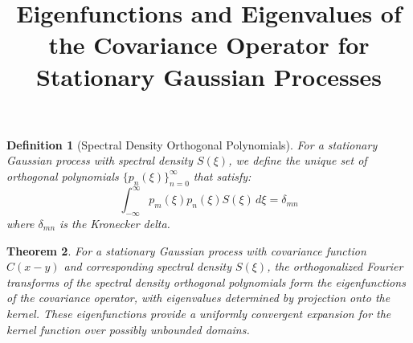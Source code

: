 \documentclass{article}
\title{Eigenfunctions and Eigenvalues of the Covariance Operator for Stationary Gaussian Processes}
\author{}
\date{}
\newtheorem{theorem}{Theorem}
\newtheorem{definition}[theorem]{Definition}
\begin{document}
\maketitle

\begin{definition}[Spectral Density Orthogonal Polynomials]
For a stationary Gaussian process with spectral density $S(\xi)$, we define the unique set of orthogonal polynomials $\{p_n(\xi)\}_{n=0}^{\infty}$ that satisfy:
\[
\int_{-\infty}^{\infty} p_m(\xi) p_n(\xi) S(\xi) \, d\xi = \delta_{mn}
\]
where $\delta_{mn}$ is the Kronecker delta.
\end{definition}

\begin{theorem}
For a stationary Gaussian process with covariance function $C(x-y)$ and corresponding spectral density $S(\xi)$, the orthogonalized Fourier transforms of the spectral density orthogonal polynomials form the eigenfunctions of the covariance operator, with eigenvalues determined by projection onto the kernel. These eigenfunctions provide a uniformly convergent expansion for the kernel function over possibly unbounded domains.
\end{theorem}
\end{document}
